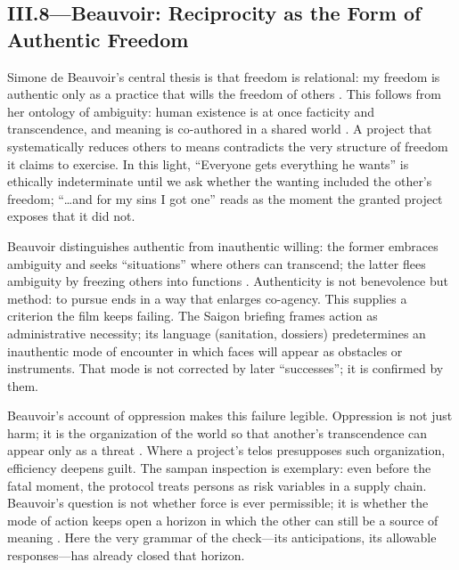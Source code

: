 \subsection*{III.8—Beauvoir: Reciprocity as the Form of Authentic Freedom}
\label{ssec:iii-beauvoir}
Simone de Beauvoir's central thesis is that freedom is relational: my freedom is authentic only as a
practice that wills the freedom of others \parencite[p.~73]{Beauvoir1976}. This follows from
her ontology of ambiguity: human existence is at once facticity and transcendence, and meaning
is co-authored in a shared world \parencite[pp.~9--14, 24--30]{Beauvoir1976}. A project that
systematically reduces others to means contradicts the very structure of freedom it claims to
exercise. In this light, ``Everyone gets everything he wants'' is ethically indeterminate until
we ask whether the wanting included the other's freedom; ``\ldots and for my sins I got one''
reads as the moment the granted project exposes that it did not.

Beauvoir distinguishes authentic from inauthentic willing: the former embraces ambiguity and
seeks ``situations'' where others can transcend; the latter flees ambiguity by freezing others
into functions \parencite[pp.~70--76, 134--145]{Beauvoir1976}. Authenticity is not benevolence
but method: to pursue ends in a way that enlarges co-agency. This supplies a criterion the film
keeps failing. The Saigon briefing frames action as administrative necessity; its language
(sanitation, dossiers) predetermines an inauthentic mode of encounter in which faces will appear
as obstacles or instruments. That mode is not corrected by later ``successes''; it is confirmed
by them.

Beauvoir's account of oppression makes this failure legible. Oppression is not just harm; it is
the organization of the world so that another's transcendence can appear only as a threat
\parencite[pp.~85--91, 157--161]{Beauvoir1976}. Where a project's telos presupposes such
organization, efficiency deepens guilt. The sampan inspection is exemplary: even before the
fatal moment, the protocol treats persons as risk variables in a supply chain. Beauvoir's
question is not whether force is ever permissible; it is whether the mode of action keeps open
a horizon in which the other can still be a source of meaning
\parencite[pp.~139--147, 164--173]{Beauvoir1976}. Here the very grammar of the check—its
anticipations, its allowable responses—has already closed that horizon.


